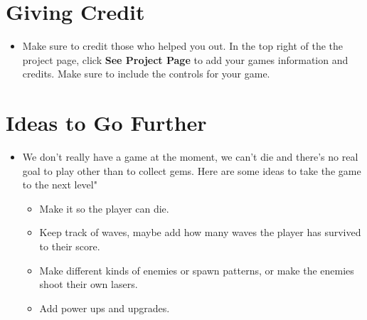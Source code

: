 \documentclass[12pt]{article}
\begin{document}
\section *{Giving Credit}
	\begin{itemize}
		\item Make sure to credit those who helped you out. In the top right of the the project page, click \textbf{See Project Page} to add your games information and credits. Make sure to include the controls for your game.
	\end{itemize}






\section *{Ideas to Go Further}
	\begin {itemize}
		\item We don't really have a game at the moment, we can't die and there's no real goal to play other than to collect gems. Here are some ideas to take the game to the next level"
		\begin{itemize}
    		\item {Make it so the player can die.}
    		\item {Keep track of waves, maybe add how many waves the player has survived to their score.}
    		\item {Make different kinds of enemies or spawn patterns, or make the enemies shoot their own lasers.}
    		\item {Add power ups and upgrades.}
		\end{itemize}
	\end{itemize}
\end{document}
